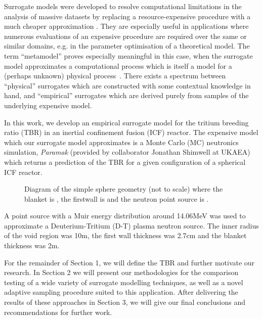 Surrogate models were developed to resolve computational limitations in the analysis of massive datasets by replacing a resource-expensive procedure with a much cheaper approximation
\cite{Sondergaard2003}. They are especially useful in applications where
numerous evaluations of an expensive procedure are required over the same or
similar domains, e.g. in the parameter optimisation of a theoretical model. The
term ``metamodel'' proves especially meaningful in this case, when the surrogate
model approximates a computational process which is itself a model for a
(perhaps unknown) physical process~\cite{Myers2002}. There exists a spectrum
between ``physical'' surrogates which are constructed with some contextual
knowledge in hand, and ``empirical'' surrogates which are derived purely from
samples of the underlying expensive model.

In this work, we develop an empirical surrogate model for the tritium breeding
ratio (TBR) in an inertial confinement fusion (ICF) reactor. The
expensive model which our surrogate model approximates is a Monte Carlo (MC)
neutronics simulation, \textit{Paramak} (provided by collaborator
Jonathan Shimwell at UKAEA) which returns a prediction of the TBR for a given configuration of a spherical ICF reactor.

\begin{figure}[!ht]
  \centering

    \caption{Diagram of the simple sphere geometry (not to scale) where the blanket is , the firstwall is  and the neutron point source is .}
    \label{fig:model_diagram}
\end{figure}

A point source with a Muir energy distribution \cite{openmcmuir} around 14.06MeV was used to approximate a Deuterium-Tritium (D-T) plasma neutron source. 
The inner radius of the void region was 10m, the first wall thickness was 2.7cm and the blanket thickness was 2m.

For the remainder of Section 1, we will define the TBR and further motivate our research. In Section 2 we will present our methodologies for the comparison testing of a wide variety of surrogate modelling techniques, as well as a novel adaptive sampling procedure suited to this application. After delivering the results of these approaches in Section 3, we will give our final conclusions and recommendations for further work.

